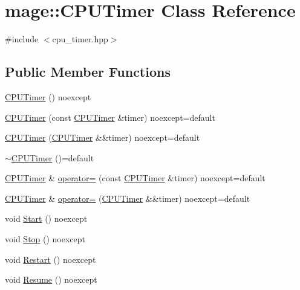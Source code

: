 \hypertarget{classmage_1_1_c_p_u_timer}{}\section{mage\+:\+:C\+P\+U\+Timer Class Reference}
\label{classmage_1_1_c_p_u_timer}


{\ttfamily \#include $<$cpu\+\_\+timer.\+hpp$>$}

\subsection*{Public Member Functions}
\begin{DoxyCompactItemize}
\item 
\hyperlink{classmage_1_1_c_p_u_timer_a52f2c0bdd6377df54363ff775a6ec430}{C\+P\+U\+Timer} () noexcept
\item 
\hyperlink{classmage_1_1_c_p_u_timer_a23afe7d7b5d85ecf1275f750a935e7c3}{C\+P\+U\+Timer} (const \hyperlink{classmage_1_1_c_p_u_timer}{C\+P\+U\+Timer} \&timer) noexcept=default
\item 
\hyperlink{classmage_1_1_c_p_u_timer_a7915bc9952e7607ffbe93f18dd1cb0b4}{C\+P\+U\+Timer} (\hyperlink{classmage_1_1_c_p_u_timer}{C\+P\+U\+Timer} \&\&timer) noexcept=default
\item 
\hyperlink{classmage_1_1_c_p_u_timer_a32583449026cf0589104767339486d4b}{$\sim$\+C\+P\+U\+Timer} ()=default
\item 
\hyperlink{classmage_1_1_c_p_u_timer}{C\+P\+U\+Timer} \& \hyperlink{classmage_1_1_c_p_u_timer_a22c40a268b8638b6f78c678fc392e4b2}{operator=} (const \hyperlink{classmage_1_1_c_p_u_timer}{C\+P\+U\+Timer} \&timer) noexcept=default
\item 
\hyperlink{classmage_1_1_c_p_u_timer}{C\+P\+U\+Timer} \& \hyperlink{classmage_1_1_c_p_u_timer_a9c831808d8caa71a019b5e4a6ffe360c}{operator=} (\hyperlink{classmage_1_1_c_p_u_timer}{C\+P\+U\+Timer} \&\&timer) noexcept=default
\item 
void \hyperlink{classmage_1_1_c_p_u_timer_abcb6e468bad9fb821c18502b6445b696}{Start} () noexcept
\item 
void \hyperlink{classmage_1_1_c_p_u_timer_ae2fa5b36f436fd160d7f5b91783c0f11}{Stop} () noexcept
\item 
void \hyperlink{classmage_1_1_c_p_u_timer_aad56acfa4f2990d6894d75721ba16f15}{Restart} () noexcept
\item 
void \hyperlink{classmage_1_1_c_p_u_timer_a8285a7306896f52adb093284d6c9da4d}{Resume} () noexcept

\end{DoxyCompactItemize}
